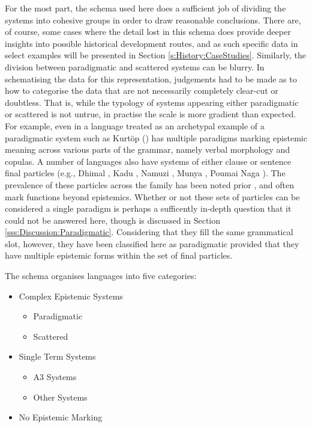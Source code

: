 For the most part, the schema used here does a sufficient job of dividing the systems into cohesive groups in order to draw reasonable conclusions. There are, of course, some cases where the detail lost in this schema does provide deeper insights into possible historical development routes, and as such specific data in select examples will be presented in Section \ref{s:History:CaseStudies}. Similarly, the division between paradigmatic and scattered systems can be blurry. In schematising the data for this representation, judgements had to be made as to how to categorise the data that are not necessarily completely clear-cut or doubtless. That is, while the typology of systems appearing either paradigmatic or scattered is not untrue, in practise the scale is more gradient than expected. For example, even in a language treated as an archetypal example of a paradigmatic system such as Kurtöp (\cite[East Bodish: Bhutan, ][]{Hyslop2020Kurtop}) has multiple paradigms marking epistemic meaning across various parts of the grammar, namely verbal morphology and copulas. A number of languages also have systems of either clause or sentence final particles (e.g., Dhimal \cite{King2009}, Kadu \cite{Sangdong2012}, Namuzi \cite{Pavlik2017}, Munya \cite{Bai2019}, Poumai Naga \cite{Veikho2021}). The prevalence of these particles across the family has been noted prior \cite{DeLancey2011}, and often mark functions beyond epistemics. Whether or not these sets of particles can be considered a single paradigm is perhaps a sufficently in-depth question that it could not be answered here, though is discussed in Section \ref{sss:Discussion:Paradigmatic}. Considering that they fill the same grammatical slot, however, they have been classified here as paradigmatic provided that they have multiple epistemic forms within the set of final particles.

The schema organises languages into five categories:
\begin{itemize}
    \item Complex Epistemic Systems
    \begin{itemize}
        \item Paradigmatic
        \item Scattered
    \end{itemize}
    \item Single Term Systems
    \begin{itemize}
        \item A3 Systems
        \item Other Systems
    \end{itemize}
    \item No Epistemic Marking
\end{itemize}
